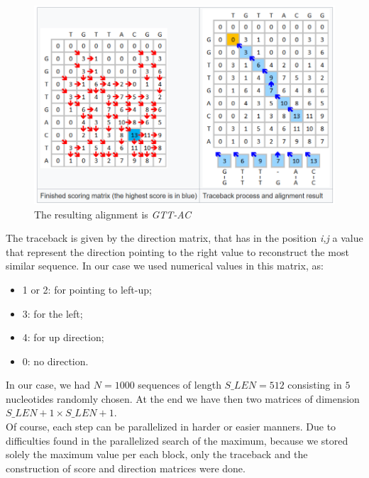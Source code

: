 \documentclass[conference]{IEEEtran}
\begin{document}
	\begin{figure}[htbp]
		\centering
		\includegraphics[width=\linewidth]{Immagine 2025-01-27 203520.png}
		\caption{The resulting alignment is \textit{GTT-AC}}
		\label{fig:boh}
	\end{figure}
	The traceback is given by the direction matrix, that has in the position \textit{i,j} a value that represent the direction pointing to the right value to reconstruct the most similar sequence. In our case we used numerical values in this matrix, as:
	\begin{itemize}
		\item 1 or 2: for pointing to left-up;
		
		\item 3: for the left;
		
		\item 4: for up direction;
		
		\item 0: no direction.
	\end{itemize}
	In our case, we had $N=1000$ sequences of length $S\_LEN=512$ consisting in $5$ nucleotides randomly chosen. At the end we have then two matrices of dimension $S\_LEN+1\times S\_LEN+1$.\\
	Of course, each step can be parallelized in harder or easier manners. Due to difficulties found in the parallelized search of the maximum, because we stored solely the maximum value per each block, only the traceback and the construction of score and direction matrices were done.
\end{document}
